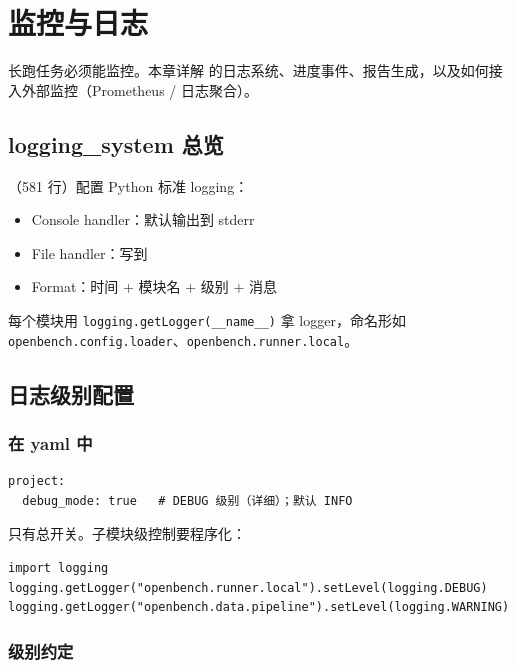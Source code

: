 
\chapter{监控与日志}

长跑任务必须能监控。本章详解 \openbench{} 的日志系统、进度事件、报告生成，以及如何接入外部监控（Prometheus / 日志聚合）。

\section{logging\_system 总览}

（581 行）配置 Python 标准 logging：

\begin{itemize}
  \item Console handler：默认输出到 stderr
  \item File handler：写到 
  \item Format：时间 + 模块名 + 级别 + 消息
\end{itemize}

每个模块用 \texttt{logging.getLogger(\_\_name\_\_)} 拿 logger，命名形如 \texttt{openbench.config.loader}、\texttt{openbench.runner.local}。

\section{日志级别配置}

\subsection{在 yaml 中}

\begin{verbatim}
project:
  debug_mode: true   # DEBUG 级别（详细）；默认 INFO
\end{verbatim}

只有总开关。子模块级控制要程序化：

\begin{verbatim}
import logging
logging.getLogger("openbench.runner.local").setLevel(logging.DEBUG)
logging.getLogger("openbench.data.pipeline").setLevel(logging.WARNING)
\end{verbatim}

\subsection{级别约定}

